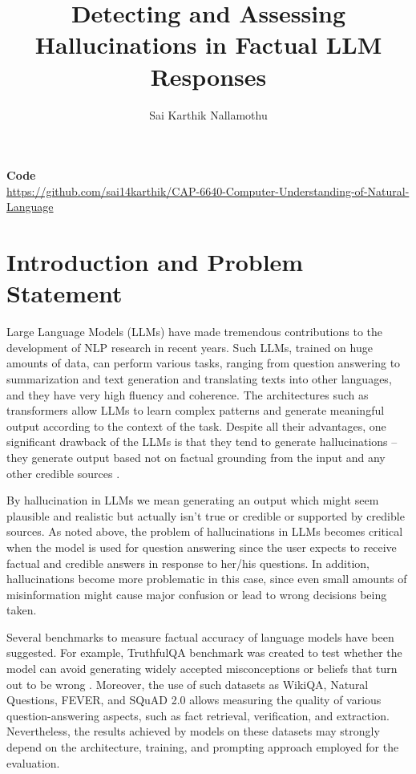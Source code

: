 \documentclass[sigconf,nonacm]{acmart}
\title{Detecting and Assessing Hallucinations in Factual LLM Responses}
\author{Sai Karthik Nallamothu}
\affiliation{%
  \institution{University of Central Florida}
  \city{Orlando}
  \state{Florida}
  \country{USA}
}
\begin{document}
\maketitle
\thispagestyle{plain}
\pagestyle{plain}
\fancyhead{}

\noindent \textbf{Code} \\
\url{https://github.com/sai14karthik/CAP-6640-Computer-Understanding-of-Natural-Language}
\section{Introduction and Problem Statement}

Large Language Models (LLMs) have made tremendous contributions to the development of NLP research in recent years. Such LLMs, trained on huge amounts of data, can perform various tasks, ranging from question answering to summarization and text generation and translating texts into other languages, and they have very high fluency and coherence. The architectures such as transformers allow LLMs to learn complex patterns and generate meaningful output according to the context of the task. Despite all their advantages, one significant drawback of the LLMs is that they tend to generate hallucinations – they generate output based not on factual grounding from the input and any other credible sources \cite{ji2023survey}.

By hallucination in LLMs we mean generating an output which might seem plausible and realistic but actually isn't true or credible or supported by credible sources. As noted above, the problem of hallucinations in LLMs becomes critical when the model is used for question answering since the user expects to receive factual and credible answers in response to her/his questions. In addition, hallucinations become more problematic in this case, since even small amounts of misinformation might cause major confusion or lead to wrong decisions being taken.

Several benchmarks to measure factual accuracy of language models have been suggested. For example, TruthfulQA benchmark was created to test whether the model can avoid generating widely accepted misconceptions or beliefs that turn out to be wrong \cite{lin2021truthfulqa}. Moreover, the use of such datasets as WikiQA, Natural Questions, FEVER, and SQuAD 2.0 allows measuring the quality of various question-answering aspects, such as fact retrieval, verification, and extraction. Nevertheless, the results achieved by models on these datasets may strongly depend on the architecture, training, and prompting approach employed for the evaluation.
\end{document}
